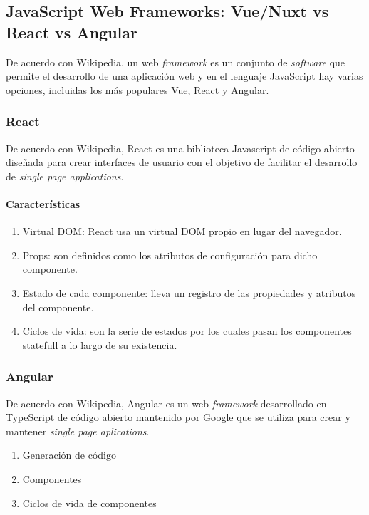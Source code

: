 \subsection{JavaScript Web Frameworks: Vue/Nuxt vs React vs Angular}

De acuerdo con Wikipedia\cite{wikipedia_contributors_web_2020}, un web \textit{framework} es un conjunto de \textit{software} que permite el desarrollo de una aplicación web y en el lenguaje JavaScript hay varias opciones, incluidas los más populares Vue, React y Angular.

\subsubsection*{React}
De acuerdo con Wikipedia\cite{wikipedia_react_2020}, React es una biblioteca Javascript de código abierto diseñada para crear interfaces de usuario con el objetivo de facilitar el desarrollo de \textit{single page applications}.

\paragraph*{Características}
\begin{enumerate}
    \item Virtual DOM: React usa un virtual DOM propio en lugar del navegador.
    \item Props: son definidos como los atributos de configuración para dicho componente.
    \item Estado de cada componente: lleva un registro de las propiedades y atributos del componente.
    \item Ciclos de vida: son la serie de estados por los cuales pasan los componentes statefull a lo largo de su existencia. 
\end{enumerate}

\subsubsection*{Angular}
De acuerdo con Wikipedia\cite{wikipedia_angular_2020}, Angular es un web \textit{framework} desarrollado en TypeScript de código abierto mantenido por Google que se utiliza para crear y mantener \textit{single page aplications}. 

\begin{enumerate}
    \item Generación de código
    \item Componentes
    \item Ciclos de vida de componentes
    
\end{enumerate}

